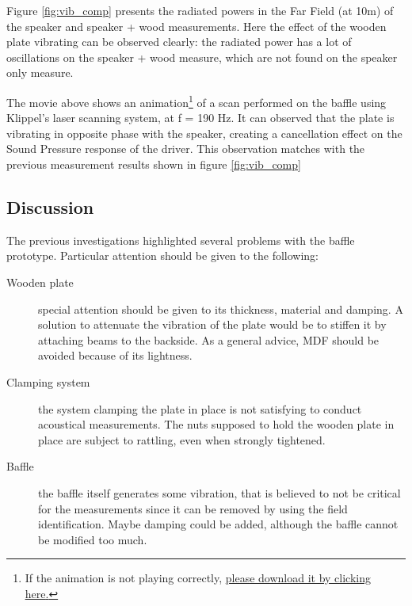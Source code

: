\documentclass{report}
\begin{document}
Figure \ref{fig:vib_comp} presents the radiated powers in the Far Field (at 10m) of the speaker and speaker + wood measurements. Here the effect of the wooden plate vibrating can be observed clearly: the radiated power has a lot of oscillations on the speaker + wood measure, which are not found on the speaker only measure. 

\ifdraft
\begin{center}
\end{center}
\else
\begin{center}
\end{center}
\fi

The movie above shows an animation\footnote{If the animation is not playing correctly, \href{https://www.dropbox.com/sh/1jlodpb3biuxmhy/AADFRz8B249n8ERu3nkwyyisa?dl=0}{please download it by clicking \underline{here}.}} of a scan performed on the baffle using Klippel's laser scanning system, at f = 190 Hz. It can observed that the plate is vibrating in opposite phase with the speaker, creating a cancellation effect on the Sound Pressure response of the driver. This observation matches with the previous measurement results shown in figure \ref{fig:vib_comp}



\subsection{Discussion}

The previous investigations highlighted several problems with the baffle prototype. Particular attention should be given to the following:
\begin{description}
\item[Wooden plate] special attention should be given to its thickness, material and damping. A solution to attenuate the vibration of the plate would be to stiffen it by attaching beams to the backside. As a general advice, MDF should be avoided because of its lightness. 
\item[Clamping system] the system clamping the plate in place is not satisfying to conduct acoustical measurements. The nuts supposed to hold the wooden plate in place are subject to rattling, even when strongly tightened.
\item[Baffle] the baffle itself generates some vibration, that is believed to not be critical for the measurements since it can be removed by using the field identification. Maybe damping could be added, although the baffle cannot be modified too much. 
\end{description}
\end{document}

